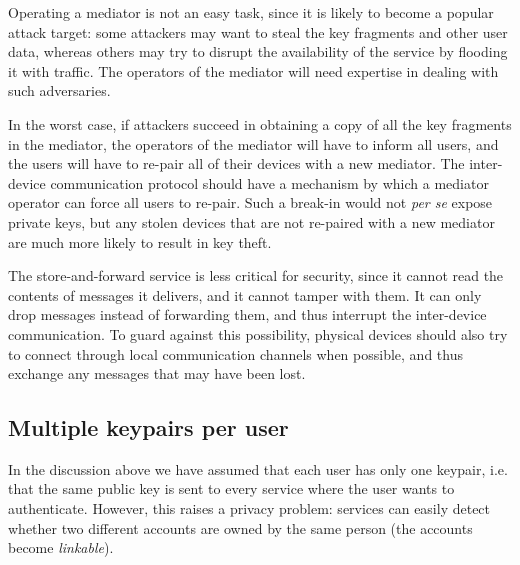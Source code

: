 Operating a mediator is not an easy task, since it is likely to become a popular attack target: some
attackers may want to steal the key fragments and other user data, whereas others may try to disrupt
the availability of the service by flooding it with traffic. The operators of the mediator will need
expertise in dealing with such adversaries.

In the worst case, if attackers succeed in obtaining a copy of all the key fragments in the
mediator, the operators of the mediator will have to inform all users, and the users will have to
re-pair all of their devices with a new mediator. The inter-device communication protocol should
have a mechanism by which a mediator operator can force all users to re-pair. Such a break-in would
not \emph{per se} expose private keys, but any stolen devices that are not re-paired with a new
mediator are much more likely to result in key theft.

The store-and-forward service is less critical for security, since it cannot read the contents of
messages it delivers, and it cannot tamper with them. It can only drop messages instead of
forwarding them, and thus interrupt the inter-device communication. To guard against this
possibility, physical devices should also try to connect through local communication channels when
possible, and thus exchange any messages that may have been lost.

\subsection{Multiple keypairs per user}\label{sec:identities}

In the discussion above we have assumed that each user has only one keypair, i.e. that the same
public key is sent to every service where the user wants to authenticate. However, this raises a
privacy problem: services can easily detect whether two different accounts are owned by the same
person (the accounts become \emph{linkable}).

